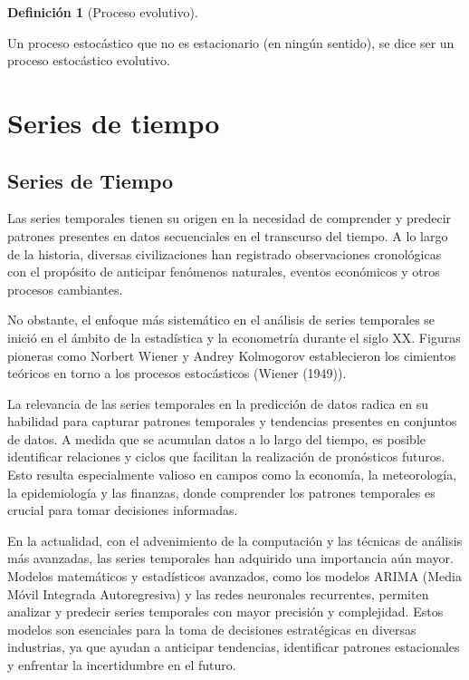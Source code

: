 \documentclass[
  us-letterpaper,
]{scrreprt}
\theoremstyle{plain}
\theoremstyle{definition}
\newtheorem{definition}{Definición}[chapter]
\theoremstyle{definition}
\theoremstyle{plain}
\theoremstyle{remark}
\begin{document}
\begin{definition}[Proceso
evolutivo]\protect\hypertarget{def-EP}{}\label{def-EP}

Un proceso estocástico que no es estacionario (en ningún sentido), se
dice ser un proceso estocástico evolutivo.

\end{definition}

\part{Series de tiempo}

\chapter{Series de Tiempo}\label{series-de-tiempo-1}

Las series temporales tienen su origen en la necesidad de comprender y
predecir patrones presentes en datos secuenciales en el transcurso del
tiempo. A lo largo de la historia, diversas civilizaciones han
registrado observaciones cronológicas con el propósito de anticipar
fenómenos naturales, eventos económicos y otros procesos cambiantes.

No obstante, el enfoque más sistemático en el análisis de series
temporales se inició en el ámbito de la estadística y la econometría
durante el siglo XX. Figuras pioneras como Norbert Wiener y Andrey
Kolmogorov establecieron los cimientos teóricos en torno a los procesos
estocásticos (Wiener (1949)).

La relevancia de las series temporales en la predicción de datos radica
en su habilidad para capturar patrones temporales y tendencias presentes
en conjuntos de datos. A medida que se acumulan datos a lo largo del
tiempo, es posible identificar relaciones y ciclos que facilitan la
realización de pronósticos futuros. Esto resulta especialmente valioso
en campos como la economía, la meteorología, la epidemiología y las
finanzas, donde comprender los patrones temporales es crucial para tomar
decisiones informadas.

En la actualidad, con el advenimiento de la computación y las técnicas
de análisis más avanzadas, las series temporales han adquirido una
importancia aún mayor. Modelos matemáticos y estadísticos avanzados,
como los modelos ARIMA (Media Móvil Integrada Autoregresiva) y las redes
neuronales recurrentes, permiten analizar y predecir series temporales
con mayor precisión y complejidad. Estos modelos son esenciales para la
toma de decisiones estratégicas en diversas industrias, ya que ayudan a
anticipar tendencias, identificar patrones estacionales y enfrentar la
incertidumbre en el futuro.
\end{document}
